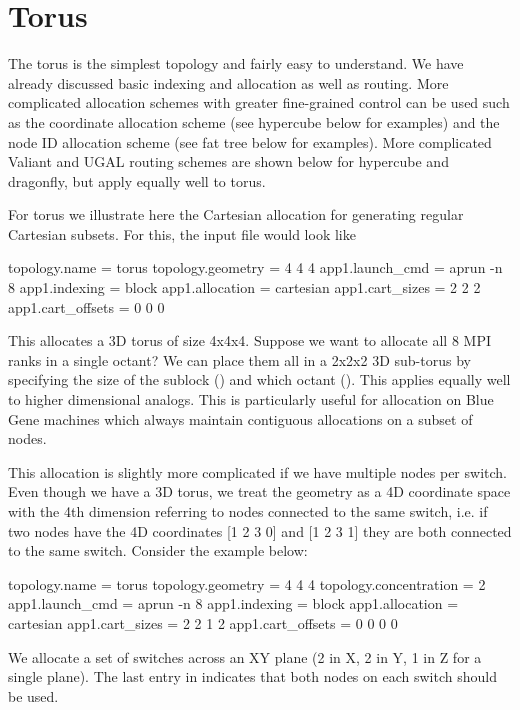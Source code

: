 \section{Torus}
\label{subsec:tutorial:hypercube}

The torus is the simplest topology and fairly easy to understand.
We have already discussed basic indexing and allocation as well as routing.
More complicated allocation schemes with greater fine-grained control can be used such as the
coordinate allocation scheme (see hypercube below for examples) and the node ID allocation scheme (see fat tree below for examples).
More complicated Valiant and UGAL routing schemes are shown below for hypercube and dragonfly,
but apply equally well to torus.

For torus we illustrate here the Cartesian allocation for generating regular Cartesian subsets.
For this, the input file would look like 

\begin{ViFile}
topology.name = torus
topology.geometry = 4 4 4
app1.launch_cmd = aprun -n 8
app1.indexing = block
app1.allocation = cartesian
app1.cart_sizes = 2 2 2
app1.cart_offsets = 0 0 0
\end{ViFile}

This allocates a 3D torus of size 4x4x4.
Suppose we want to allocate all 8 MPI ranks in a single octant?
We can place them all in a 2x2x2 3D sub-torus by specifying the size of the sublock 
() and which octant ().
This applies equally well to higher dimensional analogs.
This is particularly useful for allocation on Blue Gene machines
which always maintain contiguous allocations on a subset of nodes.

This allocation is slightly more complicated if we have multiple nodes per switch.
Even though we have a 3D torus, 
we treat the geometry as a 4D coordinate space with the 4th dimension referring to nodes connected to the same switch, 
i.e. if two nodes have the 4D coordinates [1 2 3 0] and [1 2 3 1] they are both connected to the same switch.
Consider the example below:

\begin{ViFile}
topology.name = torus
topology.geometry = 4 4 4
topology.concentration = 2
app1.launch_cmd = aprun -n 8
app1.indexing = block
app1.allocation = cartesian
app1.cart_sizes = 2 2 1 2
app1.cart_offsets = 0 0 0 0
\end{ViFile}

We allocate a set of switches across an XY plane (2 in X, 2 in Y, 1 in Z for a single plane).
The last entry in  indicates that both nodes on each switch should be used.


